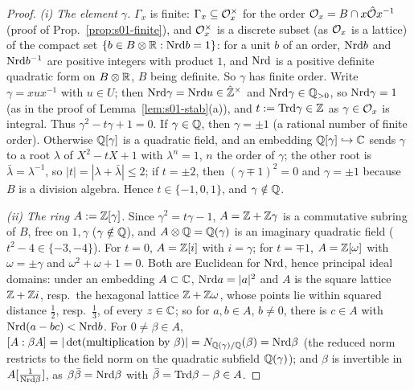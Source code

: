 \begin{proof}
\emph{(i) The element $\gamma$.} $\Gamma_x$ is finite: $\Gamma_x\subseteq\mathcal{O}_x^\times$ for the order $\mathcal{O}_x=B\cap x\hat{\mathcal{O}} x^{-1}$ (proof of
Prop.~\ref{prop:s01-finite}), and $\mathcal{O}_x^\times$ is a discrete subset (as $\mathcal{O}_x$ is a lattice) of the compact set $\{b\in B\otimes\mathbb{R}:\mathrm{Nrd} b=1\}$: for a unit $b$ of an order,
$\mathrm{Nrd} b$ and $\mathrm{Nrd} b^{-1}$ are positive integers with product $1$, and $\mathrm{Nrd}$ is a positive definite quadratic form on $B\otimes\mathbb{R}$, $B$ being definite. So $\gamma$ has finite order. Write
$\gamma=xux^{-1}$ with $u\in U$; then $\mathrm{Nrd}\gamma=\mathrm{Nrd} u\in\hat{\mathbb{Z}}^\times$ and $\mathrm{Nrd}\gamma\in\mathbb{Q}_{>0}$, so $\mathrm{Nrd}\gamma=1$ (as in the proof of
Lemma~\ref{lem:s01-stab}(a)), and $t:=\mathrm{Trd}\gamma\in\mathbb{Z}$ as $\gamma\in\mathcal{O}_x$ is integral. Thus $\gamma^2-t\gamma+1=0$. If $\gamma\in\mathbb{Q}$, then $\gamma=\pm1$ (a rational number of finite order). Otherwise $\mathbb{Q}[\gamma]$ is a
quadratic field, and an embedding $\mathbb{Q}[\gamma]\hookrightarrow\mathbb{C}$ sends $\gamma$ to a root $\lambda$ of $X^2-tX+1$ with $\lambda^n=1$, $n$ the order of $\gamma$;
the other root is $\bar\lambda=\lambda^{-1}$, so $|t|=|\lambda+\bar\lambda|\le2$; if $t=\pm2$, then $(\gamma\mp1)^2=0$ and $\gamma=\pm1$ because $B$ is a division algebra. Hence $t\in\{-1,0,1\}$, and
$\gamma\notin\mathbb{Q}$.

\emph{(ii) The ring $A:=\mathbb{Z}[\gamma]$.} Since $\gamma^2=t\gamma-1$, $A=\mathbb{Z}+\mathbb{Z}\gamma$ is a commutative subring of $B$, free on $1,\gamma$ ($\gamma\notin\mathbb{Q}$), and
$A\otimes\mathbb{Q}=\mathbb{Q}(\gamma)$ is an imaginary quadratic field ($t^2-4\in\{-3,-4\}$). For $t=0$, $A=\mathbb{Z}[i]$ with $i=\gamma$; for $t=\mp1$, $A=\mathbb{Z}[\omega]$ with
$\omega=\pm\gamma$ and $\omega^2+\omega+1=0$. Both are Euclidean for $\mathrm{Nrd}$, hence principal ideal domains: under an embedding $A\subset\mathbb{C}$, $\mathrm{Nrd} a=|a|^2$
and $A$ is the square lattice $\mathbb{Z}+\mathbb{Z} i$, resp.\ the hexagonal lattice $\mathbb{Z}+\mathbb{Z}\omega$, whose points lie within squared distance $\frac12$, resp.\ $\frac13$, of
every $z\in\mathbb{C}$; so for $a,b\in A$, $b\ne0$, there is $c\in A$ with $\mathrm{Nrd}(a-bc)<\mathrm{Nrd} b$. For $0\ne\beta\in A$, $[A:\beta A]=|\det(\text{multiplication by }\beta)|
=N_{\mathbb{Q}(\gamma)/\mathbb{Q}}(\beta)=\mathrm{Nrd}\beta$ (the reduced norm restricts to the field norm on the quadratic subfield $\mathbb{Q}(\gamma)$); and $\beta$ is invertible in
$A[\frac1{\mathrm{Nrd}\beta}]$, as $\beta\bar\beta=\mathrm{Nrd}\beta$ with $\bar\beta=\mathrm{Trd}\beta-\beta\in A$.


\end{proof}
